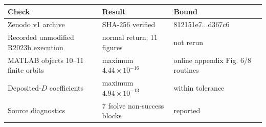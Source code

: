 \begin{tabular}{@{}p{}p{}p{}@{}}
\toprule
Check & Result & Bound \\
\midrule
Zenodo v1 archive & SHA-256 verified & 812151e7...d367c6 \\
Recorded unmodified R2023b execution & normal return; 11 figures & not rerun \\
MATLAB objects 10--11 finite orbits & maximum $4.44\times10^{-16}$ & online appendix Fig. 6/8 routines \\
Deposited-$D$ coefficients & maximum $4.94\times10^{-13}$ & within tolerance \\
Source diagnostics & 7 fsolve non-success blocks & reported \\
\bottomrule
\end{tabular}
